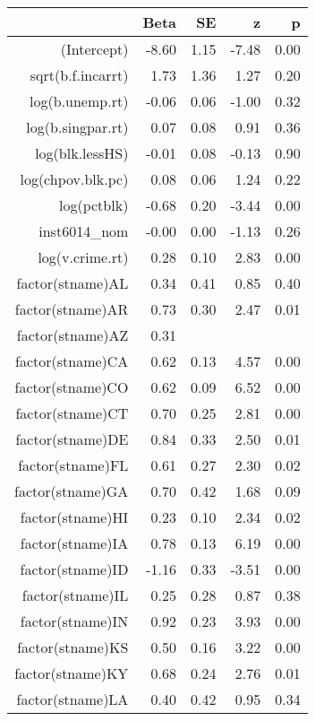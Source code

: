 \begin{table}[ht]
\centering
\begin{tabular}{rrrrr}
  \hline
 & Beta & SE & z & p \\ 
  \hline
(Intercept) & -8.60 & 1.15 & -7.48 & 0.00 \\ 
  sqrt(b.f.incarrt) & 1.73 & 1.36 & 1.27 & 0.20 \\ 
  log(b.unemp.rt) & -0.06 & 0.06 & -1.00 & 0.32 \\ 
  log(b.singpar.rt) & 0.07 & 0.08 & 0.91 & 0.36 \\ 
  log(blk.lessHS) & -0.01 & 0.08 & -0.13 & 0.90 \\ 
  log(chpov.blk.pc) & 0.08 & 0.06 & 1.24 & 0.22 \\ 
  log(pctblk) & -0.68 & 0.20 & -3.44 & 0.00 \\ 
  inst6014\_nom & -0.00 & 0.00 & -1.13 & 0.26 \\ 
  log(v.crime.rt) & 0.28 & 0.10 & 2.83 & 0.00 \\ 
  factor(stname)AL & 0.34 & 0.41 & 0.85 & 0.40 \\ 
  factor(stname)AR & 0.73 & 0.30 & 2.47 & 0.01 \\ 
  factor(stname)AZ & 0.31 &  &  &  \\ 
  factor(stname)CA & 0.62 & 0.13 & 4.57 & 0.00 \\ 
  factor(stname)CO & 0.62 & 0.09 & 6.52 & 0.00 \\ 
  factor(stname)CT & 0.70 & 0.25 & 2.81 & 0.00 \\ 
  factor(stname)DE & 0.84 & 0.33 & 2.50 & 0.01 \\ 
  factor(stname)FL & 0.61 & 0.27 & 2.30 & 0.02 \\ 
  factor(stname)GA & 0.70 & 0.42 & 1.68 & 0.09 \\ 
  factor(stname)HI & 0.23 & 0.10 & 2.34 & 0.02 \\ 
  factor(stname)IA & 0.78 & 0.13 & 6.19 & 0.00 \\ 
  factor(stname)ID & -1.16 & 0.33 & -3.51 & 0.00 \\ 
  factor(stname)IL & 0.25 & 0.28 & 0.87 & 0.38 \\ 
  factor(stname)IN & 0.92 & 0.23 & 3.93 & 0.00 \\ 
  factor(stname)KS & 0.50 & 0.16 & 3.22 & 0.00 \\ 
  factor(stname)KY & 0.68 & 0.24 & 2.76 & 0.01 \\ 
  factor(stname)LA & 0.40 & 0.42 & 0.95 & 0.34 \\ 

\end{tabular}
\end{table}
